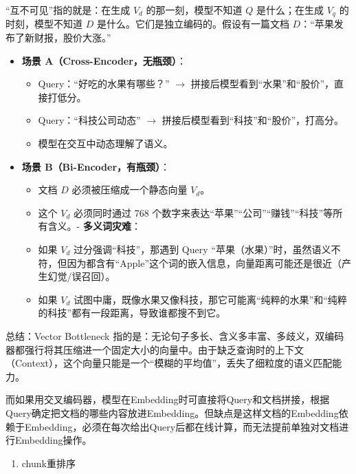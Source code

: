 ``互不可见''指的就是：在生成 \(V_d\) 的那一刻，模型不知道 \(Q\) 是什么；在生成 \(V_q\) 的时刻，模型不知道 \(D\) 是什么。它们是独立编码的。假设有一篇文档 \(D\)：``苹果发布了新财报，股价大涨。''

\begin{itemize}
\tightlist
\item
  \textbf{场景 A（Cross-Encoder，无瓶颈）}：

  \begin{itemize}
  \tightlist
  \item
    Query：``好吃的水果有哪些？'' \(\to\) 拼接后模型看到``水果''和``股价''，直接打低分。
  \item
    Query：``科技公司动态'' \(\to\) 拼接后模型看到``科技''和``股价''，打高分。
  \item
    模型在交互中动态理解了语义。
  \end{itemize}
\item
  \textbf{场景 B（Bi-Encoder，有瓶颈）}：

  \begin{itemize}
  \tightlist
  \item
    文档 \(D\) 必须被压缩成一个静态向量 \(V_d\)。
  \item
    这个 \(V_d\) 必须同时通过 768 个数字来表达``苹果''``公司''``赚钱''``科技''等所有含义。- \textbf{多义词灾难}：
  \item
    如果 \(V_d\) 过分强调``科技''，那遇到 Query ``苹果（水果）''时，虽然语义不符，但因为都含有``Apple''这个词的嵌入信息，向量距离可能还是很近（产生幻觉/误召回）。
  \item
    如果 \(V_d\) 试图中庸，既像水果又像科技，那它可能离``纯粹的水果''和``纯粹的科技''都有一段距离，导致谁都搜不到它。
  \end{itemize}
\end{itemize}

总结：Vector Bottleneck 指的是：无论句子多长、含义多丰富、多歧义，双编码器都强行将其压缩进一个固定大小的向量中。由于缺乏查询时的上下文（Context），这个向量只能是一个``模糊的平均值''，丢失了细粒度的语义匹配能力。

而如果用交叉编码器，模型在Embedding时可直接将Query和文档拼接，根据Query确定把文档的哪些内容放进Embedding。但缺点是这样文档的Embedding依赖于Embedding，必须在每次给出Query后都在线计算，而无法提前单独对文档进行Embedding操作。

\begin{enumerate}
\def\labelenumi{\arabic{enumi}.}
\setcounter{enumi}{1}
\tightlist
\item
  chunk重排序
\end{enumerate}

